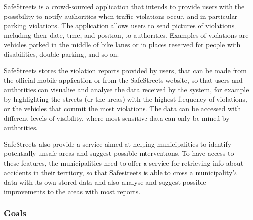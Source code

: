 SafeStreets is a crowd-sourced application that intends to provide users with the possibility to notify authorities when traffic violations occur, and in particular parking violations. The application allows users to send pictures of violations, including their date, time, and position, to authorities. Examples of violations are vehicles parked in the middle of bike lanes or in places reserved for people with disabilities, double parking, and so on.

SafeStreets stores the violation reports provided by users, that can be made from the official mobile application or from the SafeStreets website, so that users and authorities can visualise and analyse the data received by the system, for example by highlighting the streets (or the areas) with the highest frequency of violations, or the vehicles that commit the most violations. The data can be accessed with different levels of visibility, where most sensitive data can only be mined by authorities.

SafeStreets also provide a service aimed at helping municipalities to identify potentially unsafe areas and suggest possible interventions. To have access to these features, the municipalities need to offer a service for retrieving info about accidents in their territory, so that Safestreets is able to cross a municipality's data with its own stored data and also analyse and suggest possible improvements to the areas with most reports.
\subsubsection{Goals}
\begin{enumerate}[label={G\arabic*.}]
     \label{G_report_auth}
     \label{G_interventions}
     \label{G_visualization}
    \begin{enumerate}[label={G\arabic{enumi}.\arabic*.}]
    	 \label{G_visualization_cit}
    	 \label{G_visualization_auth}
    \end{enumerate}
	 \label{G_accept_reports}
	 \label{G_check_info}
\end{enumerate}
